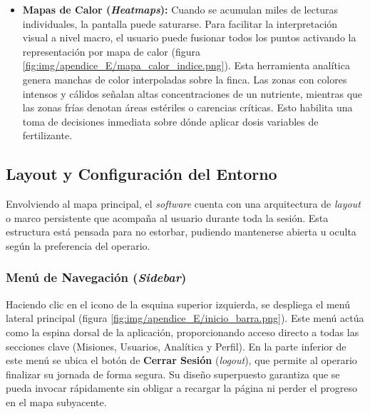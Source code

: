\begin{itemize}
    
    \item \textbf{Mapas de Calor (\textit{Heatmaps}):} Cuando se acumulan miles de lecturas individuales, la pantalla puede saturarse. Para facilitar la interpretación visual a nivel macro, el usuario puede fusionar todos los puntos activando la representación por mapa de calor (figura \ref{fig:img/apendice_E/mapa_calor_indice.png}). Esta herramienta analítica genera manchas de color interpoladas sobre la finca. Las zonas con colores intensos y cálidos señalan altas concentraciones de un nutriente, mientras que las zonas frías denotan áreas estériles o carencias críticas. Esto habilita una toma de decisiones inmediata sobre dónde aplicar dosis variables de fertilizante.
    
\end{itemize}

\subsection{Layout y Configuración del Entorno}
Envolviendo al mapa principal, el \textit{software} cuenta con una arquitectura de \textit{layout} o marco persistente que acompaña al usuario durante toda la sesión. Esta estructura está pensada para no estorbar, pudiendo mantenerse abierta u oculta según la preferencia del operario.

\subsubsection{Menú de Navegación (\textit{Sidebar})}
Haciendo clic en el icono de la esquina superior izquierda, se despliega el menú lateral principal (figura \ref{fig:img/apendice_E/inicio_barra.png}). Este menú actúa como la espina dorsal de la aplicación, proporcionando acceso directo a todas las secciones clave (Misiones, Usuarios, Analítica y Perfil). En la parte inferior de este menú se ubica el botón de \textbf{Cerrar Sesión} (\textit{logout}), que permite al operario finalizar su jornada de forma segura. Su diseño superpuesto garantiza que se pueda invocar rápidamente sin obligar a recargar la página ni perder el progreso en el mapa subyacente.


